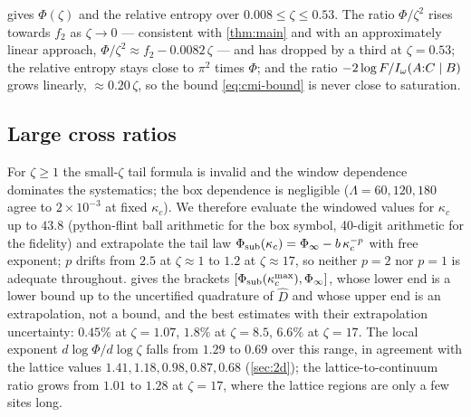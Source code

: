  gives $\Phi(\zeta)$ and the relative entropy over
$0.008\le\zeta\le0.53$.  The ratio $\Phi/\zeta^2$ rises towards $f_2$ as
$\zeta\to0$ --- consistent with \cref{thm:main} and with an approximately linear
approach, $\Phi/\zeta^2\approx f_2-0.0082\,\zeta$ --- and has dropped by a third at
$\zeta=0.53$; the relative entropy stays close to $\pi^2$ times $\Phi$; and the
ratio $-2\log F/I_\omega(A{:}C\mid B)$ grows linearly, $\approx0.20\,\zeta$, so
the bound \eqref{eq:cmi-bound} is never close to saturation.



\subsection{Large cross ratios}
For \(\zeta\ge1\) the small-\(\zeta\) tail formula is invalid and the window dependence dominates the systematics; the box dependence is negligible (\(\Lambda=60,120,180\) agree to \(2\times10^{-3}\) at fixed \(\kappa_c\)).  We therefore evaluate the windowed values for \(\kappa_c\) up to \(43.8\) (python-flint ball arithmetic for the box symbol, 40-digit arithmetic for the fidelity) and extrapolate the tail law \(\Phi_{\rm sub}(\kappa_c)=\Phi_\infty-b\,\kappa_c^{-p}\) with free exponent; \(p\) drifts from \(2.5\) at \(\zeta\approx1\) to \(1.2\) at \(\zeta\approx17\), so neither \(p=2\) nor \(p=1\) is adequate throughout.   gives the brackets \([\Phi_{\rm sub}(\kappa_c^{\max}),\Phi_\infty]\), whose lower end is a lower bound up to the uncertified quadrature of \(\widehat D\) and whose upper end is an extrapolation, not a bound, and the best estimates with their extrapolation uncertainty: \(0.45\%\) at \(\zeta=1.07\), \(1.8\%\) at \(\zeta=8.5\), \(6.6\%\) at \(\zeta=17\).  The local exponent \(d\log\Phi/d\log\zeta\) falls from \(1.29\) to \(0.69\) over this range, in agreement with the lattice values \(1.41,1.18,0.98,0.87,0.68\) (\cref{sec:2d}); the lattice-to-continuum ratio grows from \(1.01\) to \(1.28\) at \(\zeta=17\), where the lattice regions are only a few sites long.



